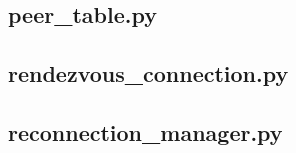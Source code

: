 \documentclass[12pt,a4paper]{article}
\begin{document}
\newpage
\subsection{peer\_table.py}


\newpage
\subsection{rendezvous\_connection.py}


\newpage
\subsection{reconnection\_manager.py}

\end{document}
